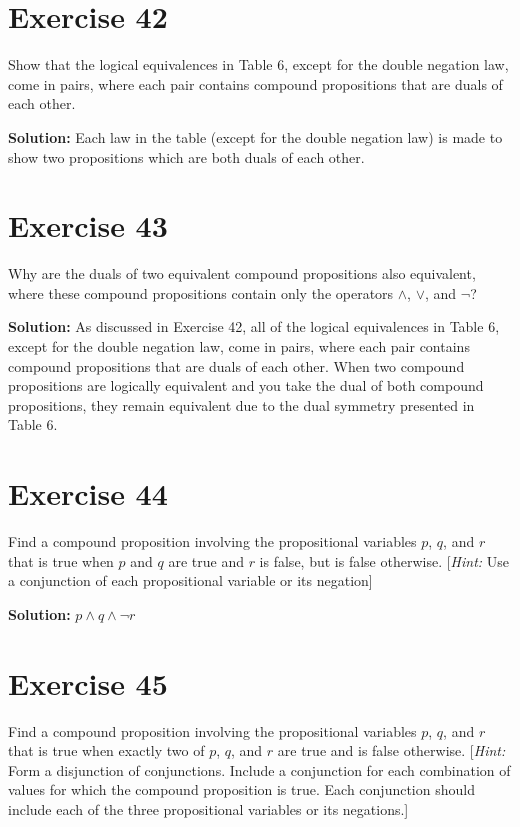 \documentclass{Axon}
\begin{document}
\section*{Exercise 42}
Show that the logical equivalences in Table 6, except for the double negation law, come in pairs, where each pair contains compound propositions that are duals of each other.

\noindent
\textbf{Solution:}
Each law in the table (except for the double negation law) is made to show two propositions which are both duals of each other.

\section*{Exercise 43}
Why are the duals of two equivalent compound propositions also equivalent, where these compound propositions contain only the operators \(\land\), \(\lor\), and \(\lnot\)?

\noindent
\textbf{Solution:}
As discussed in Exercise 42, all of the logical equivalences in Table 6, except for the double negation law, come in pairs, where each pair contains compound propositions that are duals of each other. When two compound propositions are logically equivalent and you take the dual of both compound propositions, they remain equivalent due to the dual symmetry presented in Table 6.

\section*{Exercise 44}
Find a compound proposition involving the propositional variables \(p\), \(q\), and \(r\) that is true when \(p\) and \(q\) are true and \(r\) is false, but is false otherwise. [\textit{Hint:} Use a conjunction of each propositional variable or its negation]

\noindent
\textbf{Solution:}
\(p \land q \land \lnot r\)

\section*{Exercise 45}
Find a compound proposition involving the propositional variables \(p\), \(q\), and \(r\) that is true when exactly two of \(p\), \(q\), and \(r\) are true and is false otherwise. [\textit{Hint:} Form a disjunction of conjunctions. Include a conjunction for each combination of values for which the compound proposition is true. Each conjunction should include each of the three propositional variables or its negations.]
\end{document}
